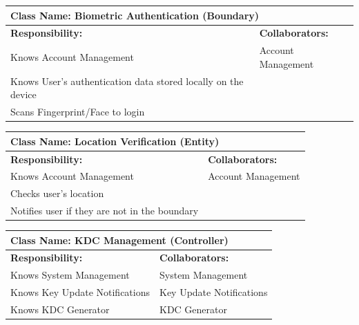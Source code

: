 \documentclass[]{article}
\begin{document}
\begin{table}[ht]
	\centering
	\begin{tabular}{|p{7cm}|p{7cm}|}
		\hline
		\multicolumn{2}{|l|}{\textbf{Class Name:} Biometric Authentication (Boundary)}             \\
		\hline
		\textbf{Responsibility:}                             & \textbf{Collaborators:}  \\
		\hline
		Knows Account Management							          & Account Management         \\
		Knows User’s authentication data stored locally on the device &                            \\
		Scans Fingerprint/Face to login								  &                            \\


		\hline
	\end{tabular}
\end{table}

\begin{table}[ht]
	\centering
	\begin{tabular}{|p{7cm}|p{7cm}|}
		\hline
		\multicolumn{2}{|l|}{\textbf{Class Name:} Location Verification (Entity)}             \\
		\hline
		\textbf{Responsibility:}                             & \textbf{Collaborators:}  \\
		\hline
		Knows Account Management	    			         & Account Management         \\
		Checks user’s location 								 &                            \\
		Notifies user if they are not in the boundary	     &                            \\


		\hline
	\end{tabular}
\end{table}

\begin{table}[ht]
	\centering
	\begin{tabular}{|p{7cm}|p{7cm}|}
		\hline
		\multicolumn{2}{|l|}{\textbf{Class Name:} KDC Management (Controller)}             \\
		\hline
		\textbf{Responsibility:}                             & \textbf{Collaborators:}  \\
		\hline
		Knows System Management	         			         & System Management         \\
		Knows Key Update Notifications						 & Key Update Notifications  \\
		Knows KDC Generator									 & KDC Generator             \\


		\hline
	\end{tabular}
\end{table}
\end{document}
